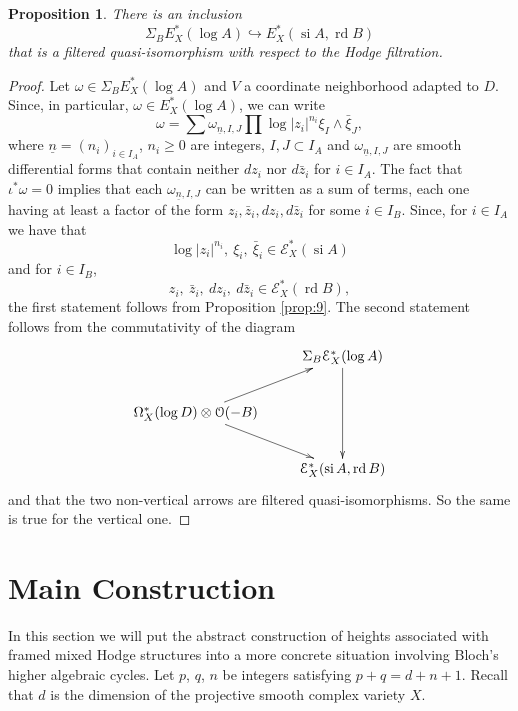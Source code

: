 \documentclass[11pt,a4paper]{amsart}
\newcommand{\caE}{\mathcal{E}}
\newcommand{\caO}{\mathcal{O}}
\DeclareMathOperator{\si}{si}
\DeclareMathOperator{\rd}{rd}
\numberwithin{equation}{section}
\theoremstyle{plain}
\newtheorem{prop}{Proposition}[section]
\theoremstyle{definition}
\begin{document}
\begin{prop}\label{prop:11} There is an inclusion
  \begin{displaymath}
      \Sigma _{B}E^{\ast}_{X}(\log A) \hookrightarrow E^{\ast}_{X}(\si
      A, \rd B)
  \end{displaymath}
  that is a filtered quasi-isomorphism with respect to the Hodge
  filtration. 
\end{prop}
\begin{proof}
  Let $\omega \in \Sigma _{B}E^{\ast}_{X}(\log A)$ and 
  $V$ a coordinate neighborhood adapted to $D$. Since, in particular,
  $\omega \in E^{\ast}_{X}(\log A)$, we can write
  \begin{displaymath}
    \omega =\sum \omega_{\underline n,I,J}   \prod \log|z_i|^{n_i}\xi_I\wedge \bar \xi_J,
  \end{displaymath}
  where $\underline {n}=(n_i)_{i\in I_A}$, $n_i\ge 0$ are integers, $I,J\subset
  I_A$ and $\omega_{\underline n,I,J}$ are smooth differential forms
  that contain neither $dz_i$ nor $d\bar z_i$ for $i\in I_A$. The fact
  that $\iota ^\ast\omega =0$ implies that each $\omega
  _{\underline{n},I,J}$ can be written as a sum of terms, each one
  having at least a factor of the form $z_i, \bar z_i, dz_i, d\bar z_i$ for
  some $i\in I_B$. Since, for $i\in I_A$ we have that
  \begin{displaymath}
    \log|z_i|^{n_i}, \ \xi_i,\ \bar \xi_i  \in \caE_X^\ast(\si A)
  \end{displaymath}
  and for $i\in I_B$,
  \begin{displaymath}
    z_i,\  \bar z_i,\  dz_i,\  d\bar z_i \in \caE_X^\ast(\rd B),
  \end{displaymath}
  the first statement follows from Proposition \ref{prop:9}. The
  second statement follows from the commutativity of the diagram
  \begin{displaymath}
    \xymatrix{
      & \Sigma _B\caE^{\ast}_X(\log A)\ar[dd]\\
      \Omega ^{\ast}_X(\log D)\otimes \caO(-B)\ar[ur]\ar[dr] &\\
      & \caE^{\ast}_X(\si A,\rd B)
    }
  \end{displaymath}
  and that the two non-vertical arrows are filtered
  quasi-isomorphisms. So the same is true for the vertical one.  
\end{proof}

\section{Main Construction}   
\label{sec:main-construction}
In this section we will put the abstract construction of heights
associated with framed mixed Hodge structures into a more concrete
situation involving Bloch's higher algebraic cycles. Let $p$, $q$, $n$
be integers satisfying $p+q=d+n+1$. Recall that $d$ is the dimension
of the projective smooth complex variety $X$.
\end{document}
